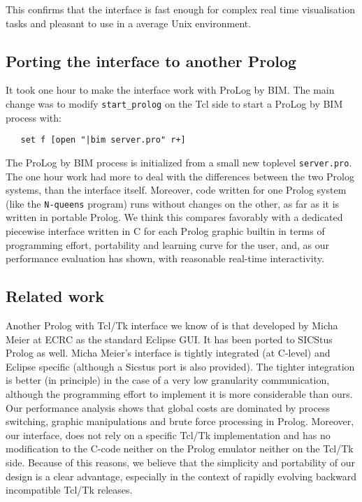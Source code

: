 \documentclass{article}
\begin{document}
This confirms that the interface is fast enough for complex
real time visualisation tasks and pleasant to use in a
average Unix environment.


\subsection{Porting the interface to another Prolog}

It took one hour to make the interface work with ProLog by BIM.
The main change was to modify \verb~start_prolog~ on the
Tcl side to start a ProLog by BIM process with:

{\small \begin{verbatim}
   set f [open "|bim server.pro" r+]
\end{verbatim}}

{\flushleft  The} ProLog by BIM process is initialized from
a small new toplevel \verb~server.pro~. The one hour work
had more to deal with the differences between the two 
Prolog systems,
than the interface itself. Moreover, code written for
one Prolog system (like the {\tt N-queens} program) 
runs without changes on the other, 
as far as it is written in portable Prolog.
We think this compares favorably with
a dedicated piecewise interface written
in C for each Prolog graphic builtin
in terms of programming effort,
portability and learning curve for the user,
and, as our performance evaluation has shown,
with reasonable real-time interactivity.

\subsection{Related work}

Another Prolog with Tcl/Tk interface we know
of is that developed by
Micha Meier at ECRC as the standard
Eclipse GUI. It has been ported to SICStus Prolog as well.
Micha Meier's interface is tightly integrated (at C-level)
and Eclipse specific (although a Sicstus port is also provided).
The tighter integration is better (in principle)
in the case
of a very low granularity communication, although
the programming effort to implement it is
more considerable than ours.
Our performance analysis
shows that global costs are dominated by process switching,
graphic manipulations and brute force processing in Prolog.
Moreover, our interface, does
not rely on a specific Tcl/Tk implementation and has
no modification to the C-code neither on the Prolog emulator
neither on the Tcl/Tk side.
Because of this reasons, we believe that
the simplicity and portability
of our design is a clear advantage,
especially in the context of rapidly evolving
backward incompatible Tcl/Tk releases.
\end{document}

